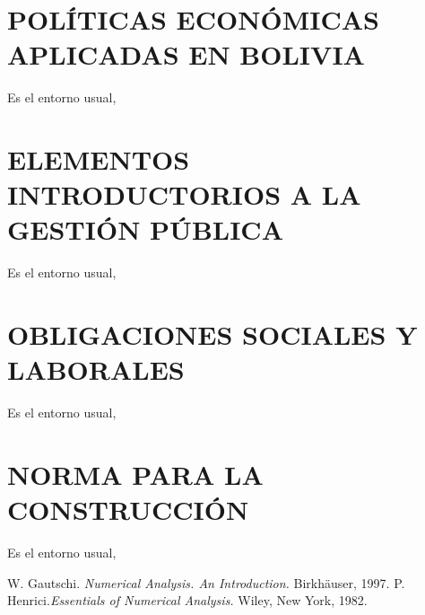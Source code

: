 \documentclass[xcolor=pdftex, x11names,table]{book}
\begin{document}
\chapter{POLÍTICAS ECONÓMICAS APLICADAS EN BOLIVIA}
Es el entorno usual,

%
\chapter{ELEMENTOS INTRODUCTORIOS A LA GESTIÓN PÚBLICA}
Es el entorno usual,


\chapter{OBLIGACIONES SOCIALES Y LABORALES}
Es el entorno usual,


 \chapter{NORMA PARA LA CONSTRUCCIÓN}
 Es el entorno usual,
 
 
 
 \clearpage
\thispagestyle{empty}
 \begin{thebibliography}{AAAAAA}%
  W. Gautschi. {\em Numerical Analysis. An Introduction.}
 		Birkh\"{a}user, 1997.
  P. Henrici.{\it Essentials of Numerical Analysis.}
 		 Wiley, New York, 1982.
  \end{thebibliography}
  
 
\end{document}
